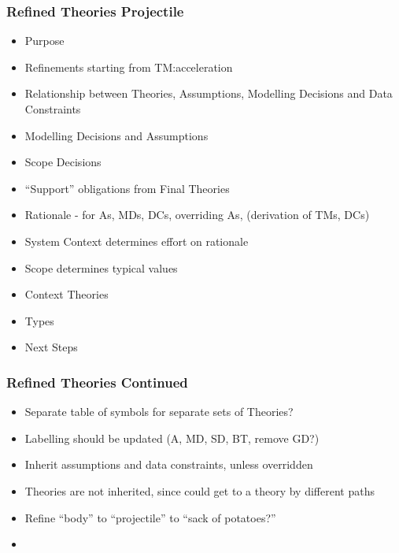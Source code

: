 \documentclass[t,12pt,numbers,fleqn]{beamer}
\begin{document}


\begin{frame}
\frametitle{Refined Theories Projectile}

\begin{itemize} %
\item Purpose %
\item Refinements starting from TM:acceleration
\item Relationship between Theories, Assumptions, Modelling Decisions and Data Constraints
\item Modelling Decisions and Assumptions
\item Scope Decisions
\item ``Support'' obligations from Final Theories
\item Rationale - for As, MDs, DCs, overriding As, (derivation of TMs, DCs)
\item System Context determines effort on rationale
\item Scope determines typical values
\item Context Theories
\item Types
\item Next Steps
\end{itemize}

\end{frame}


\begin{frame}
\frametitle{Refined Theories Continued}

\begin{itemize}

\item Separate table of symbols for separate sets of Theories?
\item Labelling should be updated (A, MD, SD, BT, remove GD?)
\item Inherit assumptions and data constraints, unless overridden
\item Theories are not inherited, since could get to a theory by different paths
\item Refine ``body'' to ``projectile'' to ``sack of potatoes?''
\item 
\end{itemize}

\end{frame}

\end{document}

